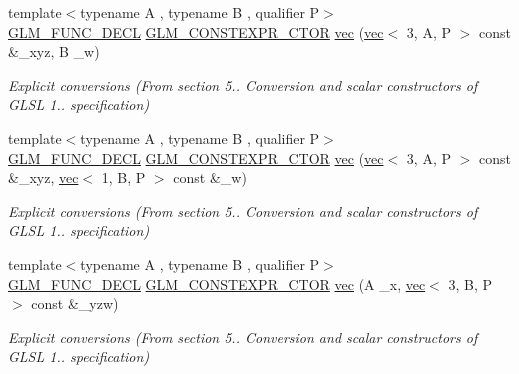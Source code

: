 \begin{DoxyCompactItemize}
{\footnotesize template$<$typename A , typename B , qualifier P$>$ }\\\mbox{\hyperlink{setup_8hpp_ab2d052de21a70539923e9bcbf6e83a51}{G\+L\+M\+\_\+\+F\+U\+N\+C\+\_\+\+D\+E\+CL}} \mbox{\hyperlink{setup_8hpp_ad34178a09666081abdb573c14d1f4a5a}{G\+L\+M\+\_\+\+C\+O\+N\+S\+T\+E\+X\+P\+R\+\_\+\+C\+T\+OR}} \mbox{\hyperlink{structglm_1_1vec_3_014_00_01_t_00_01_q_01_4_af4d56895a23186981b30f2ef72a780c9}{vec}} (\mbox{\hyperlink{structglm_1_1vec}{vec}}$<$ 3, A, P $>$ const \&\+\_\+xyz, B \+\_\+w)
\begin{DoxyCompactList}\small\item\em Explicit conversions (From section 5.. Conversion and scalar constructors of G\+L\+SL 1.. specification) \end{DoxyCompactList}\item 
{\footnotesize template$<$typename A , typename B , qualifier P$>$ }\\\mbox{\hyperlink{setup_8hpp_ab2d052de21a70539923e9bcbf6e83a51}{G\+L\+M\+\_\+\+F\+U\+N\+C\+\_\+\+D\+E\+CL}} \mbox{\hyperlink{setup_8hpp_ad34178a09666081abdb573c14d1f4a5a}{G\+L\+M\+\_\+\+C\+O\+N\+S\+T\+E\+X\+P\+R\+\_\+\+C\+T\+OR}} \mbox{\hyperlink{structglm_1_1vec_3_014_00_01_t_00_01_q_01_4_a978b89aabfd77a4d64bbd7d347e98ffe}{vec}} (\mbox{\hyperlink{structglm_1_1vec}{vec}}$<$ 3, A, P $>$ const \&\+\_\+xyz, \mbox{\hyperlink{structglm_1_1vec}{vec}}$<$ 1, B, P $>$ const \&\+\_\+w)
\begin{DoxyCompactList}\small\item\em Explicit conversions (From section 5.. Conversion and scalar constructors of G\+L\+SL 1.. specification) \end{DoxyCompactList}\item 
{\footnotesize template$<$typename A , typename B , qualifier P$>$ }\\\mbox{\hyperlink{setup_8hpp_ab2d052de21a70539923e9bcbf6e83a51}{G\+L\+M\+\_\+\+F\+U\+N\+C\+\_\+\+D\+E\+CL}} \mbox{\hyperlink{setup_8hpp_ad34178a09666081abdb573c14d1f4a5a}{G\+L\+M\+\_\+\+C\+O\+N\+S\+T\+E\+X\+P\+R\+\_\+\+C\+T\+OR}} \mbox{\hyperlink{structglm_1_1vec_3_014_00_01_t_00_01_q_01_4_a91225fa0646f68aae775792183d3e0df}{vec}} (A \+\_\+x, \mbox{\hyperlink{structglm_1_1vec}{vec}}$<$ 3, B, P $>$ const \&\+\_\+yzw)
\begin{DoxyCompactList}\small\item\em Explicit conversions (From section 5.. Conversion and scalar constructors of G\+L\+SL 1.. specification) \end{DoxyCompactList}\item 

\end{DoxyCompactItemize}
